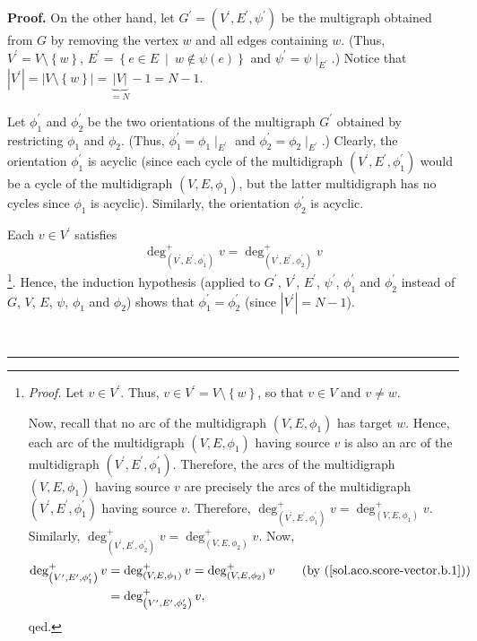 \documentclass[numbers=enddot,12pt,final,onecolumn,notitlepage]{scrartcl}%
\theoremstyle{definition}
\newenvironment{proof}[1][Proof]{\noindent\textbf{#1.} }{\ \rule{0.5em}{0.5em}}
\begin{document}
\begin{proof}
On the other hand, let $G^{\prime}=\left(  V^{\prime},E^{\prime},\psi^{\prime
}\right)  $ be the multigraph obtained from $G$ by removing the vertex $w$ and
all edges containing $w$. (Thus, $V^{\prime}=V\setminus\left\{  w\right\}  $,
$E^{\prime}=\left\{  e\in E\ \mid\ w\notin\psi\left(  e\right)  \right\}  $
and $\psi^{\prime}=\psi\mid_{E^{\prime}}$.) Notice that $\left\vert V^{\prime
}\right\vert =\left\vert V\setminus\left\{  w\right\}  \right\vert
=\underbrace{\left\vert V\right\vert }_{=N}-1=N-1$.

Let $\phi_{1}^{\prime}$ and $\phi_{2}^{\prime}$ be the two orientations of the
multigraph $G^{\prime}$ obtained by restricting $\phi_{1}$ and $\phi_{2}$.
(Thus, $\phi_{1}^{\prime}=\phi_{1}\mid_{E^{\prime}}$ and $\phi_{2}^{\prime
}=\phi_{2}\mid_{E^{\prime}}$.) Clearly, the orientation $\phi_{1}^{\prime}$ is
acyclic (since each cycle of the multidigraph $\left(  V^{\prime},E^{\prime
},\phi_{1}^{\prime}\right)  $ would be a cycle of the multidigraph $\left(
V,E,\phi_{1}\right)  $, but the latter multidigraph has no cycles since
$\phi_{1}$ is acyclic). Similarly, the orientation $\phi_{2}^{\prime}$ is acyclic.

Each $v\in V^{\prime}$ satisfies%
\[
\deg_{\left(  V^{\prime},E^{\prime},\phi_{1}^{\prime}\right)  }^{+}%
v=\deg_{\left(  V^{\prime},E^{\prime},\phi_{2}^{\prime}\right)  }^{+}v
\]
\footnote{\textit{Proof.} Let $v\in V^{\prime}$. Thus, $v\in V^{\prime
}=V\setminus\left\{  w\right\}  $, so that $v\in V$ and $v\neq w$.
\par
Now, recall that no arc of the multidigraph $\left(  V,E,\phi_{1}\right)  $
has target $w$. Hence, each arc of the multidigraph $\left(  V,E,\phi
_{1}\right)  $ having source $v$ is also an arc of the multidigraph $\left(
V^{\prime},E^{\prime},\phi_{1}^{\prime}\right)  $. Therefore, the arcs of the
multidigraph $\left(  V,E,\phi_{1}\right)  $ having source $v$ are precisely
the arcs of the multidigraph $\left(  V^{\prime},E^{\prime},\phi_{1}^{\prime
}\right)  $ having source $v$. Therefore, $\deg_{\left(  V^{\prime},E^{\prime
},\phi_{1}^{\prime}\right)  }^{+}v=\deg_{\left(  V,E,\phi_{1}\right)  }^{+}v$.
Similarly, $\deg_{\left(  V^{\prime},E^{\prime},\phi_{2}^{\prime}\right)
}^{+}v=\deg_{\left(  V,E,\phi_{2}\right)  }^{+}v$. Now,%
\begin{align*}
\deg_{\left(  V^{\prime},E^{\prime},\phi_{1}^{\prime}\right)  }^{+}v  &
=\deg_{\left(  V,E,\phi_{1}\right)  }^{+}v=\deg_{\left(  V,E,\phi_{2}\right)
}^{+}v\qquad \left(  \text{by (\ref{sol.aco.score-vector.b.1}%
)}\right) \\
&  =\deg_{\left(  V^{\prime},E^{\prime},\phi_{2}^{\prime}\right)  }^{+}v,
\end{align*}
qed.}. Hence, the induction hypothesis (applied to $G^{\prime}$, $V^{\prime}$,
$E^{\prime}$, $\psi^{\prime}$, $\phi_{1}^{\prime}$ and $\phi_{2}^{\prime}$
instead of $G$, $V$, $E$, $\psi$, $\phi_{1}$ and $\phi_{2}$) shows that
$\phi_{1}^{\prime}=\phi_{2}^{\prime}$ (since $\left\vert V^{\prime}\right\vert
=N-1$).


\end{proof}
\end{document}
